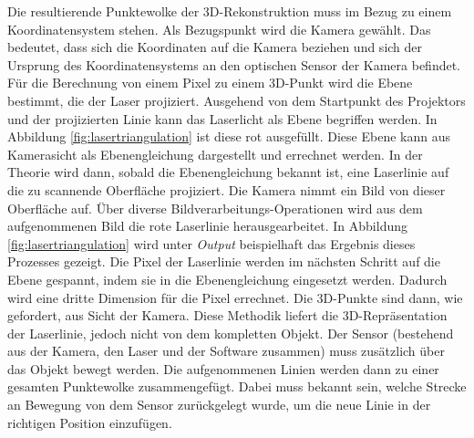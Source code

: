 	Die resultierende Punktewolke der 3D-Rekonstruktion muss im Bezug zu einem Koordinatensystem stehen. Als Bezugspunkt wird die Kamera gewählt. Das bedeutet, dass sich die Koordinaten auf die Kamera beziehen und sich der Ursprung des Koordinatensystems an den optischen Sensor der Kamera befindet. Für die Berechnung von einem Pixel zu einem 3D-Punkt wird die Ebene bestimmt, die der Laser projiziert. Ausgehend von dem Startpunkt des Projektors und der projizierten Linie kann das Laserlicht als Ebene begriffen werden. In Abbildung \ref{fig:lasertriangulation} ist diese rot ausgefüllt. Diese Ebene kann aus Kamerasicht als Ebenengleichung dargestellt und errechnet werden. In der Theorie wird dann, sobald die Ebenengleichung bekannt ist, eine Laserlinie auf die zu scannende Oberfläche projiziert. Die Kamera nimmt ein Bild von dieser Oberfläche auf. Über diverse Bildverarbeitungs-Operationen wird aus dem aufgenommenen Bild die rote Laserlinie herausgearbeitet. In Abbildung \ref{fig:lasertriangulation} wird unter \emph{Output} beispielhaft das Ergebnis dieses Prozesses gezeigt. Die Pixel der Laserlinie werden im nächsten Schritt auf die Ebene gespannt, indem sie in die Ebenengleichung eingesetzt werden. Dadurch wird eine dritte Dimension für die Pixel errechnet. Die 3D-Punkte sind dann, wie gefordert, aus Sicht der Kamera. Diese Methodik liefert die 3D-Repräsentation der Laserlinie, jedoch nicht von dem kompletten Objekt. Der Sensor (bestehend aus der Kamera, den Laser und der Software zusammen) muss zusätzlich über das Objekt bewegt werden. Die aufgenommenen Linien werden dann zu einer gesamten Punktewolke zusammengefügt. Dabei muss bekannt sein, welche Strecke an Bewegung von dem Sensor zurückgelegt wurde, um die neue Linie in der richtigen Position einzufügen. 
